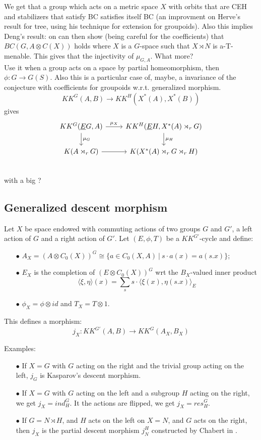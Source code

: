 We get that a group which acts on a metric space $X$ with orbits that are CEH and stabilizers that satisfy BC satisfies itself BC (an improvment on Herve's result for tree, using his technique for extension for groupoids). Also this implies Deng's result: on can then show (being careful for the coefficients) that $BC(G, A \otimes C(X))$ holds where $X$ is a $G$-space such that $X\rtimes N$ is a-T-menable. This gives that the injectivity of $\mu_{G,A}$. What more?\\

Use it when a group acts on a space by partial homeomorphism, then $\phi: G \rightarrow G(S)$. Also this is a particular case of, maybe, a invariance of the conjecture with coefficients for groupoids w.r.t. generalized morphism.
\[KK^G(A,B) \rightarrow KK^H(X^*(A), X^*(B))\]
gives
\[\begin{tikzcd}
KK^{G}(\underline E G, A ) \arrow{d}{\mu_{G}}\arrow{r}{\mu_X} 
		& KK^{H}(\underline E H, X^*(A)\rtimes_r G ) 	\arrow{d}{\mu_H}\\
	K(A\rtimes_r G) \arrow{r}	& K(X^*(A)\rtimes_r G \rtimes_r H) \\ 
\end{tikzcd}\]
with a big ?
\subsection{Generalized descent morphism}

Let $X$ be space endowed with commuting actions of two groups $G$ and $G'$, a left action of $G$ and a right action of $G'$. Let $(E,\phi, T)$ be a $KK^{G'}$-cycle and define:
\begin{itemize}
\item[$\bullet$] $A_X = (A\otimes C_0(X))^G \cong \{a \in C_0(X,A) \ | \ s\cdot a(x) = a(s.x)\}$;
\item[$\bullet$] $E_X$ is the completion of $(E\otimes C_0(X))^G$ wrt the $B_X$-valued inner product
\[ \langle \xi , \eta  \rangle (x) =\sum_s s\cdot \langle \xi(x) , \eta (s.x) \rangle_E\]
\item[$\bullet$] $\phi_X = \phi \otimes id $ and $T_X = T\otimes 1$.  
\end{itemize}

This defines a morphism:
\[ j_X: KK^{G'}(A,B) \rightarrow  KK^{G}(A_X,B_X) \]

Examples:
\begin{itemize}
\item[$\bullet$] If $X=G$ with $G$ acting on the right and the trivial group acting on the left, $j_G$ is Kasparov's descent morphism.
\item[$\bullet$] If $X=G$ with $G$ acting on the left and a subgroup $H$ acting on the right, we get $j_X=  ind_H^G$. It the actions are flipped, we get $j_X= res_H^G$.
\item[$\bullet$] If $G = N\rtimes H$, and $H$ acts on the left on $X=N$, and $G$ acts on the right, then $j_X$ is the partial descent morphism $j_N^H$ constructed by Chabert in \cite{}. 
\end{itemize}

